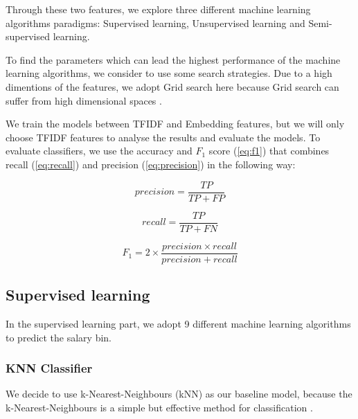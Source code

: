 \documentclass[11pt]{article}
\begin{document}
Through these two features, we explore three different machine learning algorithms paradigms: Supervised learning, Unsupervised learning and Semi-supervised learning.

To find the parameters which can lead the highest performance of the machine learning algorithms, we consider to use some search strategies.
Due to a high dimentions of the features, we adopt Grid search here because Grid search can suffer from high dimensional spaces \cite{liashchynskyi2019grid}.

We train the models between TFIDF and Embedding features, but we will only choose TFIDF features to analyse the results and evaluate the models.
To evaluate classifiers, we use the accuracy and $F_1$ score (\ref{eq:f1}) that combines recall (\ref{eq:recall}) and precision (\ref{eq:precision}) in the following way: \cite{TAN2006290}

\begin{equation}
    precision = \frac{TP}{TP + FP}
    \label{eq:precision}
\end{equation}

\begin{equation}
    recall = \frac{TP}{TP + FN}
    \label{eq:recall}
\end{equation}

\begin{equation}
    F_1 = 2 \times \frac{precision \times recall}{precision + recall}
    \label{eq:f1}
\end{equation}










\subsection{Supervised learning}
In the supervised learning part, we adopt 9 different machine learning algorithms to predict the salary bin.


\subsubsection{KNN Classifier}
We decide to use k-Nearest-Neighbours (kNN) as our baseline model, because the k-Nearest-Neighbours is a simple but effective method for classification \cite{10.1007/978-3-540-39964-3_62}.
\end{document}

